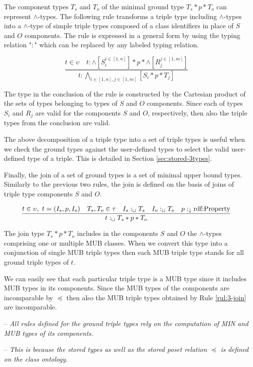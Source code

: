 \documentclass[runningheads]{llncs}
\newcommand{\darr}{\downarrow}
\newcommand{\notes}[1]{\noindent\begin{small}-- \emph{#1}\hfill\break\end{small}}
\begin{document}
The component types $T_s$ and $T_o$ of the minimal ground type
$T_s*p*T_o$ can represent $\land$-types. The following rule transforms
a triple type including $\land$-types into a $\land$-type of simple
triple types composed of a class identifiers in place of $S$ and $O$
components. The rule is expressed in a general form by using the
typing relation "$:$" which can be replaced by any labeled typing
relation.

\begin{equation}
\label{rul:3-land-transform}
\dfrac{t\in\upsilon\quad t:\land[S_i^{i\in[1,n]}]*p*\land[R_j^{j\in[1,m]}]}
      {t:\bigwedge_{i\in[1,n], j\in[1,m]}[S_i*p*T_j]}
\end{equation}

The type in the conclusion of the rule is constructed by the Cartesian
product of the sets of types belonging to types of $S$ and $O$
components. Since each of types $S_i$ and $R_j$ are valid for the
components $S$ and $O$, respectively, then also the triple types from
the conclusion are valid.

The above decomposition of a triple type into a set of triple types is
useful when we check the ground types against the user-defined types
to select the valid user-defined type of a triple. This is detailed in
Section \ref{sec:stored-3types}.

Finally, the join of a set of ground types is a set of minimal upper
bound types. Similarly to the previous two rules, the join is defined
on the basis of joins of triple type components $S$ and $O$.

\begin{equation}
\label{rul:3-join}
\dfrac{t\in\upsilon,\ t=(I_s,p,I_o)\quad T_s,T_o\in\tau\quad I_s:_\sqcup\/T_s\quad I_o:_\sqcup\/T_o\quad p:_\darr\text{rdf:Property}}
      {t:_\sqcup\/T_s*p*T_o}
\end{equation}

The join type $T_s*p*T_o$ includes in the components $S$ and $O$ the
$\land$-types comprising one or multiple MUB classes. When we convert
this type into a conjunction of single MUB triple types then each MUB
triple type stands for all ground triple types of $t$.

We can easily see that each particular triple type is a MUB type since
it includes MUB types in its components. Since the MUB types of the
components are incomparable by $\preceq$ then also the MUB triple
types obtained by Rule \ref{rul:3-join} are incomparable.

\notes{All rules defined for the ground triple types rely on the computation of MIN and MUB types of its components.}
\notes{This is because the stored types as well as the stored poset relation $\preceq$ is defined on the class ontology.}
\end{document}
